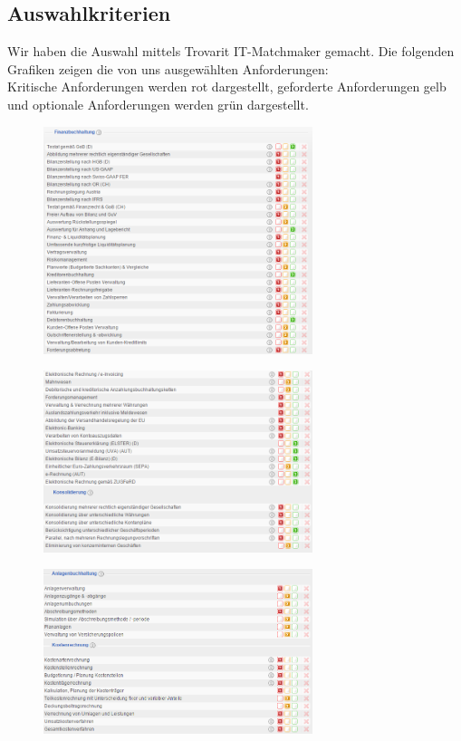 \documentclass[12pt]{article}
\begin{document}
\subsection{Auswahlkriterien}
Wir haben die Auswahl mittels Trovarit IT-Matchmaker gemacht. Die folgenden Grafiken zeigen die von uns ausgewählten Anforderungen: \\
Kritische Anforderungen werden rot dargestellt, geforderte Anforderungen gelb und optionale Anforderungen werden grün dargestellt.
\begin{figure}[here!]
\centering
\includegraphics[width=0.7\textwidth]{images/tr1}
\end{figure}\FloatBarrier
\noindent
\begin{figure}[here!]
\centering
\includegraphics[width=0.7\textwidth]{images/tr2}
\end{figure}\FloatBarrier
\noindent
\begin{figure}[here!]
\centering
\includegraphics[width=0.7\textwidth]{images/tr3}
\end{figure}\FloatBarrier
\end{document}
